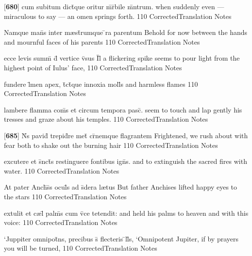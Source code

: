\latline
  {[\textbf{680}] cum subitum dict\={}que oritur m\={\macron {\i}}r\={}bile m\={}ntrum.}
  { when suddenly even --- miraculous to say --- an omen springs forth. }
  {110}
  { CorrectedTranslation }
  { Notes }


\latline
  {Namque man\={}s inter m{\ae}st\={}rumque \={}ra parentum}
  { Behold for now between the hands and mournful faces of his parents }
  {110}
  { CorrectedTranslation }
  { Notes }


\latline
  {ecce levis summ\={} d\={} vertice v\={\macron {\i}}sus I\={}l\={\macron {\i}}}
  { a flickering spike seems to pour light from the highest point of Iulus' face, }
  {110}
  { CorrectedTranslation }
  { Notes }


\latline
  {fundere l\={}men apex, t\={}ct\={}que innoxia moll\={\macron {\i}}s}
  { and harmless flames  }
  {110}
  { CorrectedTranslation }
  { Notes }


\latline
  {lambere flamma com\={}s et circum tempora pasc\={\macron {\i}}.}
  { seem to touch and lap gently his tresses and graze about his temples. }
  {110}
  { CorrectedTranslation }
  { Notes }


\latline
  {[\textbf{685}] N\={}s pavid\={\macron {\i}} trepid\={}re met\={} cr\={\macron {\i}}nemque flagrantem}
  { Frightened, we rush about with fear both to shake out the burning hair }
  {110}
  { CorrectedTranslation }
  { Notes }


\latline
  {excutere et s\={}nct\={}s restinguere fontibus ign\={\macron {\i}}s.}
  { and to extinguish the sacred fires with water. }
  {110}
  { CorrectedTranslation }
  { Notes }


\latline
  {At pater Anch\={\macron {\i}}s\={}s ocul\={}s ad s\={\macron {\i}}dera l{\ae}tus}
  { But father Anchises lifted happy eyes to the stars }
  {110}
  { CorrectedTranslation }
  { Notes }


\latline
  {extulit et c{\ae}l\={} palm\={}s cum v\={}ce tetendit:}
  { and held his palms to heaven and with this voice: }
  {110}
  { CorrectedTranslation }
  { Notes }


\latline
  {`Juppiter omnipot\={}ns, precibus s\={\macron {\i}} flecteris \={}ll\={\macron {\i}}s,}
  { `Omnipotent Jupiter, if by prayers you will be turned, }
  {110}
  { CorrectedTranslation }
  { Notes }


